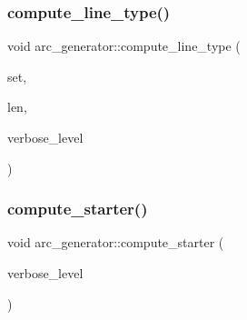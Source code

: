\mbox{\label{classarc__generator_ab14c3db7fbdf3952bdd39990fd90706a}} 
\subsubsection{\texorpdfstring{compute\+\_\+line\+\_\+type()}{compute\_line\_type()}}
{\footnotesize\ttfamily void arc\+\_\+generator\+::compute\+\_\+line\+\_\+type (\begin{DoxyParamCaption}\item[{\mbox{\hyperlink{galois_8h_a09fddde158a3a20bd2dcadb609de11dc}{I\+NT}} $\ast$}]{set,  }\item[{\mbox{\hyperlink{galois_8h_a09fddde158a3a20bd2dcadb609de11dc}{I\+NT}}}]{len,  }\item[{\mbox{\hyperlink{galois_8h_a09fddde158a3a20bd2dcadb609de11dc}{I\+NT}}}]{verbose\+\_\+level }\end{DoxyParamCaption})}

\mbox{\label{classarc__generator_aad1dcec3a1c302e743d574bd1ac857d9}} 
\subsubsection{\texorpdfstring{compute\+\_\+starter()}{compute\_starter()}}
{\footnotesize\ttfamily void arc\+\_\+generator\+::compute\+\_\+starter (\begin{DoxyParamCaption}\item[{\mbox{\hyperlink{galois_8h_a09fddde158a3a20bd2dcadb609de11dc}{I\+NT}}}]{verbose\+\_\+level }\end{DoxyParamCaption})}

\mbox{\label{classarc__generator_aece1e6e90966f973d44d6a3f8f26ecaf}} 
